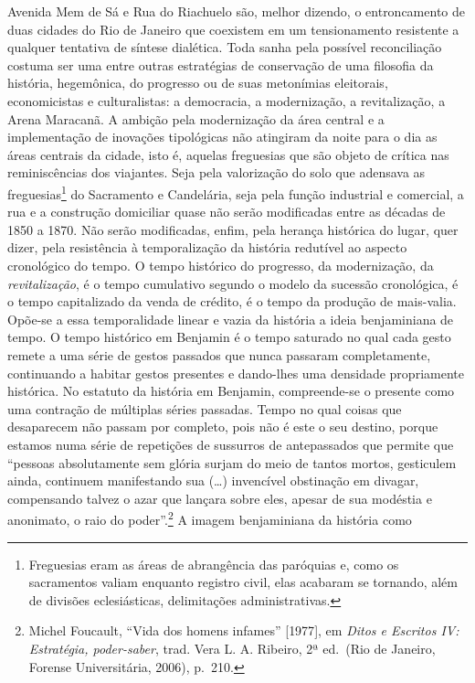 Avenida Mem de Sá e Rua do Riachuelo são, melhor dizendo, o
entroncamento de duas cidades do Rio de Janeiro que coexistem em um
tensionamento resistente a qualquer tentativa de síntese dialética. Toda
sanha pela possível reconciliação costuma ser uma entre outras
estratégias de conservação de uma filosofia da história, hegemônica, do
progresso ou de suas metonímias eleitorais, economicistas e
culturalistas: a democracia, a modernização, a revitalização, a Arena
Maracanã. A ambição pela modernização da área central e a implementação
de inovações tipológicas não atingiram da noite para o dia as áreas
centrais da cidade, isto é, aquelas freguesias que são objeto de crítica
nas reminiscências dos viajantes. Seja pela valorização do solo que
adensava as freguesias\footnote{Freguesias eram as áreas de abrangência
  das paróquias e, como os sacramentos valiam enquanto registro civil,
  elas acabaram se tornando, além de divisões eclesiásticas,
  delimitações administrativas.} do Sacramento e Candelária, seja pela
função industrial e comercial, a rua e a construção domiciliar quase não
serão modificadas entre as décadas de 1850 a 1870. Não serão
modificadas, enfim, pela herança histórica do lugar, quer dizer, pela
resistência à temporalização da história redutível ao aspecto
cronológico do tempo. O tempo histórico do progresso, da modernização,
da \emph{revitalização}, é o tempo cumulativo segundo o modelo da
sucessão cronológica, é o tempo capitalizado da venda de crédito, é o
tempo da produção de mais-valia. Opõe-se a essa temporalidade linear e
vazia da história a ideia benjaminiana de tempo. O tempo histórico em
Benjamin é o tempo saturado no qual cada gesto remete a uma série de
gestos passados que nunca passaram completamente, continuando a habitar
gestos presentes e dando-lhes uma densidade propriamente histórica. No
estatuto da história em Benjamin, compreende-se o presente como uma
contração de múltiplas séries passadas. Tempo no qual coisas que
desaparecem não passam por completo, pois não é este o seu destino,
porque estamos numa série de repetições de sussurros de antepassados que
permite que ``pessoas absolutamente sem glória surjam do meio de tantos
mortos, gesticulem ainda, continuem manifestando sua (\ldots{})
invencível obstinação em divagar, compensando talvez o azar que lançara
sobre eles, apesar de sua modéstia e anonimato, o raio do
poder''.\footnote{Michel Foucault, ``Vida dos homens infames''
  {[}1977{]}, em \emph{Ditos e Escritos IV: Estratégia, poder-saber},
  trad. Vera L. A. Ribeiro, 2ª ed.~(Rio de Janeiro, Forense
  Universitária, 2006), p.~210.} A imagem benjaminiana da história como
